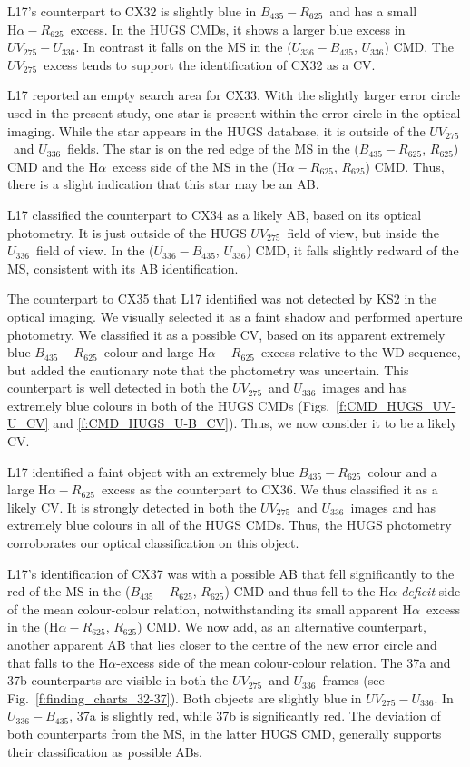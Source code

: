 \documentclass[fleqn,usenatbib]{mnras}
\newcommand{\B}{\mbox{$B_{435}$}}
\newcommand{\R}{\mbox{$R_{625}$}}
\newcommand{\br}{\mbox{$\B\!-\!\R$}}
\newcommand{\ha}{\mbox{H$\alpha$}}
\newcommand{\hr}{\mbox{$\ha\!-\!\R$}}
\newcommand{\UV}{\mbox{$UV_{275}$}}
\newcommand{\U}{\mbox{$U_{336}$}}
\newcommand{\uvu}{\mbox{$\UV\!-\!\U$}}
\newcommand{\uvb}{\mbox{$\UV\!-\!\B$}}
\newcommand{\ub}{\mbox{$\U\!-\!\B$}}
\begin{document}
L17's counterpart to CX32 is slightly blue in \br\ and has a small \hr\ excess. In the HUGS CMDs, it shows a larger blue excess in \uvu. In contrast it falls on the MS in the (\ub, \U) CMD\@. The \UV\ excess tends to support the identification of CX32 as a CV\@.

L17 reported an empty search area for CX33\@. With the slightly larger error circle used in the present study, one star is present within the error circle in the optical imaging. While the star appears in the HUGS database, it is outside of the \UV\ and \U\ fields. The star is on the red edge of the MS in the (\br, \R) CMD and the \ha\ excess side of the MS in the (\hr, \R) CMD. Thus, there is a slight indication that this star may be an AB.  

L17 classified the counterpart to CX34 as a likely AB, based on its optical photometry. It is just outside of the HUGS \UV\ field of view, but inside the \U\ field of view. In the (\ub, \U) CMD, it falls slightly redward of the MS, consistent with its AB identification. 

The counterpart to CX35 that L17 identified was not detected by KS2 in the optical imaging. We visually selected it as a faint shadow and performed aperture photometry. We classified it as a possible CV, based on its apparent extremely blue \br\ colour and large \hr\ excess relative to the WD sequence, but added the cautionary note that the photometry was uncertain. This counterpart is well detected in both the \UV\ and \U\ images and has extremely blue colours in both of the HUGS CMDs (Figs.~\ref{f:CMD_HUGS_UV-U_CV} and \ref{f:CMD_HUGS_U-B_CV}). Thus, we now consider it to be a likely CV\@. 

L17 identified a faint object with an extremely blue \br\ colour and a large \hr\ excess as the counterpart to CX36. We thus classified it as a likely CV\@. It is strongly detected in both the \UV\ and \U\ images and has extremely blue colours in all of the HUGS CMDs\@. Thus, the HUGS photometry corroborates our optical classification on this object. 

L17's identification of CX37 was with a possible AB that fell significantly to the red of the MS in the (\br, \R) CMD and thus fell to the \ha-\emph{deficit} side of the mean colour-colour relation, notwithstanding its small apparent \ha\ excess in the (\hr, \R) CMD\@. We now add, as an alternative counterpart, another apparent AB that lies closer to the centre of the new error circle and that falls to the \ha-excess side of the mean colour-colour relation. The 37a and 37b counterparts are visible in both the \UV\ and \U\ frames (see Fig.~\ref{f:finding_charts_32-37}). Both objects are slightly blue in \uvu. In \ub, 37a is slightly red, while 37b is significantly red. %
The deviation of both counterparts from the MS, in the latter HUGS CMD, generally supports their classification as possible ABs.
\end{document}

